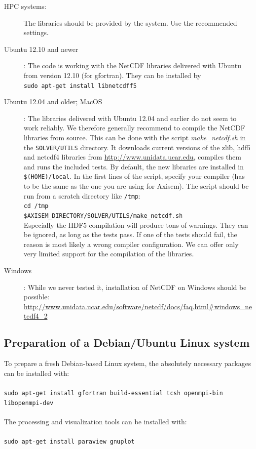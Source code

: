 \documentclass{article}
\begin{document}
\begin{description}
    \item[HPC systems:] The libraries should be provided by the system. Use the
          recommended settings.
    \item[Ubuntu 12.10 and newer]: The code is working with the NetCDF libraries delivered
          with Ubuntu from version 12.10 (for gfortran). They can be installed by \\
          \verb|sudo apt-get install libnetcdff5|
    \item[Ubuntu 12.04 and older; MacOS]: The libraries delivered with Ubuntu 12.04 and
          earlier do not seem to work reliably. We therefore generally recommend to
          compile the NetCDF libraries from source. This can be done with the script
          \textit{make\_netcdf.sh} in the \verb|SOLVER/UTILS| directory. It downloads
          current versions of the zlib, hdf5 and netcdf4 libraries from
          \url{http://www.unidata.ucar.edu}, compiles them and runs the included tests. By
          default, the new libraries are installed in \verb|$(HOME)/local|. In the first
          lines of the script, specify your compiler (has to be the same as the one you
          are using for Axisem). The script should be run from a scratch directory like
          \verb|/tmp|:\\
          \verb|cd /tmp|\\
          \verb|$AXISEM_DIRECTORY/SOLVER/UTILS/make_netcdf.sh|\\
          Especially the HDF5 compilation will produce tons of warnings. They can be
          ignored, as long as the tests pass. If one of the tests should fail, the reason
          is most likely a wrong compiler configuration. We can offer only very limited
          support for the compilation of the libraries.
    \item[Windows]: While we never tested it, installation of NetCDF on Windows should be
          possible: \url{http://www.unidata.ucar.edu/software/netcdf/docs/faq.html#windows_netcdf4_2}
\end{description}


\subsection{Preparation of a Debian/Ubuntu Linux system}
To prepare a fresh Debian-based Linux system, the absolutely necessary packages can be installed with:\\ \\
 \verb|sudo apt-get install gfortran build-essential tcsh openmpi-bin libopenmpi-dev|\\ \\
The processing and visualization tools can be installed with:\\ \\
 \verb|sudo apt-get install paraview gnuplot|
\end{document}
